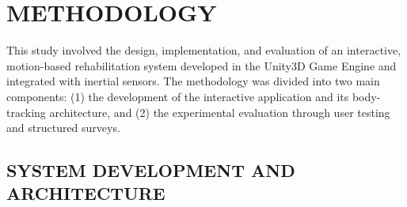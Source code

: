 \documentclass[a4paper,twoside]{article}
\begin{document}
\section{\uppercase{Methodology}}

This study involved the design, implementation, and evaluation of an interactive, motion-based rehabilitation system developed in the Unity3D Game Engine and integrated with inertial sensors. The methodology was divided into two main components: (1) the development of the interactive application and its body-tracking architecture, and (2) the experimental evaluation through user testing and structured surveys.

\subsection{\uppercase{System Development and Architecture}}
\end{document}
